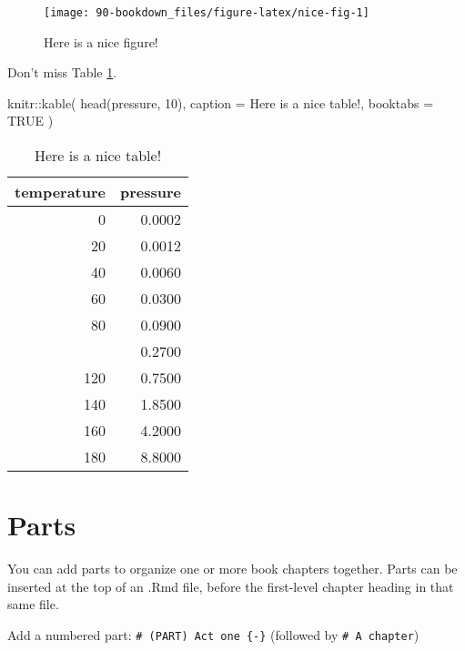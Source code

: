 \documentclass[
]{book}
\newenvironment{Shaded}{\begin{snugshade}}{\end{snugshade}}
\newcommand{\AttributeTok}[1]{\textcolor[rgb]{0.77,0.63,0.00}{#1}}
\newcommand{\ConstantTok}[1]{\textcolor[rgb]{0.00,0.00,0.00}{#1}}
\newcommand{\DecValTok}[1]{\textcolor[rgb]{0.00,0.00,0.81}{#1}}
\newcommand{\FunctionTok}[1]{\textcolor[rgb]{0.00,0.00,0.00}{#1}}
\newcommand{\NormalTok}[1]{#1}
\newcommand{\SpecialCharTok}[1]{\textcolor[rgb]{0.00,0.00,0.00}{#1}}
\newcommand{\StringTok}[1]{\textcolor[rgb]{0.31,0.60,0.02}{#1}}
\theoremstyle{definition}
\theoremstyle{definition}
\theoremstyle{definition}
\theoremstyle{definition}
\theoremstyle{remark}
\begin{document}
\begin{figure}

{\centering \texttt{[image: 90-bookdown\_files/figure-latex/nice-fig-1]} 

}

\caption{Here is a nice figure!}\label{fig:nice-fig}
\end{figure}

Don't miss Table \ref{tab:nice-tab}.

\begin{Shaded}
\begin{Highlighting}[]
\NormalTok{knitr}\SpecialCharTok{::}\FunctionTok{kable}\NormalTok{(}
  \FunctionTok{head}\NormalTok{(pressure, }\DecValTok{10}\NormalTok{), }\AttributeTok{caption =} \StringTok{\textquotesingle{}Here is a nice table!\textquotesingle{}}\NormalTok{,}
  \AttributeTok{booktabs =} \ConstantTok{TRUE}
\NormalTok{)}
\end{Highlighting}
\end{Shaded}

\begin{table}

\caption{\label{tab:nice-tab}Here is a nice table!}
\centering
\begin{tabular}[t]{rr}
\toprule
temperature & pressure\\
\midrule
0 & 0.0002\\
20 & 0.0012\\
40 & 0.0060\\
60 & 0.0300\\
80 & 0.0900\\
\addlinespace
100 & 0.2700\\
120 & 0.7500\\
140 & 1.8500\\
160 & 4.2000\\
180 & 8.8000\\
\bottomrule
\end{tabular}
\end{table}

\hypertarget{parts}{%
\section{Parts}\label{parts}}

You can add parts to organize one or more book chapters together. Parts can be inserted at the top of an .Rmd file, before the first-level chapter heading in that same file.

Add a numbered part: \texttt{\#\ (PART)\ Act\ one\ \{-\}} (followed by \texttt{\#\ A\ chapter})
\end{document}
